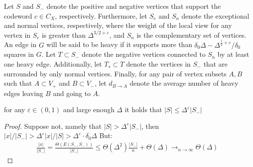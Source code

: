 \begin{definition}
Let $S$ and $S_{-}$ denote the positive and negative vertices that support the codeword $c \in C_{X}$, respectively. Furthermore, let $S_e$ and $S_n$ denote the exceptional and normal vertices, respectively, where the weight of the local view for any vertex in $S_e$ is greater than $\Delta^{3/2 + \varepsilon}$, and $S_n$ is the complementary set of vertices. An edge in $G$ will be said to be heavy if it supports more than $\delta_{0}\Delta - \Delta^{\frac{1}{2} + \varepsilon}/\delta_{0}$ squares in $G$. Let $T \subset S_{-}$ denote the negative vertices connected to $S_{n}$ by at least one heavy edge. Additionally, let $T_s \subset T$ denote the vertices in $S_-$ that are surrounded by only normal vertices. Finally, for any pair of vertex subsets $A,B$ such that $A \subset V_{+}$ and $B \subset V_{-}$, let $d_{B\rightarrow A}$ denote the average number of heavy edges leaving $B$ and going to $A$.
\end{definition}
\begin{claim}
  \label{claim:epss}
  for any $\varepsilon \in \left( 0,1 \right)$ and large enough $\Delta$  it holds that $ |S| \le \Delta^{\varepsilon}|S_{-}| $ 
\end{claim}
\begin{proof}
  Suppose not, namely that $|S| > \Delta^{\varepsilon}|S_{-}|$, then $|x|/|S_{-}| > \Delta^{\varepsilon}|x|/|S| > \Delta^{\varepsilon} \cdot \delta_{0}\Delta $ But:  
\begin{equation*}
  \begin{split}
    \frac{|x|}{|S_{-}|} = \frac{\Theta \left(E(S_{-},S_{-}) \right)}{|S_{-}|} \le \Theta(\Delta^{2})\frac{|S_{-}|}{n}  + \Theta(\Delta)  \rightarrow_{n\rightarrow \infty} \Theta(\Delta)
  \end{split}
\end{equation*}
\end{proof}

